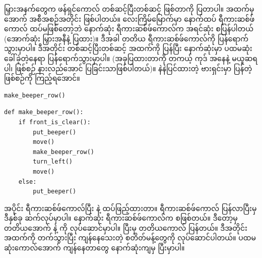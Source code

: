 မြှားအနက်တွေက ဖန်ရှင်ကောလ်  တစ်ဆင့်ပြီးတစ်ဆင့် ဖြစ်တာကို ပြတာပါ။ အထက်မှအောက် အစီ\allowbreak အစဉ်အတိုင်း ဖြစ်ပါတယ်။ လေးကြိမ်မြောက်မှာ နောက်ထပ် ရီကားဆစ်ဖ်ကောလ် ထပ်မဖြစ်တော့ဘဲ နောက်ဆုံး ရီကားဆစ်ဖ်ကောလ်က အရင်ဆုံး  စပြန်ပါတယ် (အောက်ဆုံး မြှားအနီနဲ့ ပြထား)။ ဒီအခါ တတိယ ရီကားဆစ်ဖ်ကောလ်ကို ပြန်ရောက်သွားမှာပါ။ ဒီအတိုင်း တစ်ဆင့်ပြီးတစ်ဆင့် အထက်ကို  ပြန်ပြီး နောက်ဆုံးမှာ ပထမဆုံး ခေါ်ခဲ့တဲ့နေရာ ပြန်ရောက်သွားမှာပါ။ (အခုပြထားတာကို တကယ့်  ကုဒ် အနေနဲ့ မယူဆရပါ၊ ဖြစ်စဉ် နားလည်အောင် ပြခြင်းသာဖြစ်ပါတယ်)။ နဲနဲပြင်ထားတဲ့   ဗားရှင်းမှာ  ပြန်တဲ့ ဖြစ်စဉ်ကို ကြည့်ရအောင်။ 

%
\setlength{\fboxsep}{0pt}
\begin{verbatim}
make_beeper_row()
\end{verbatim}
%
\betweenminted{\medskipamount}
%
\setlength{\fboxsep}{0pt}
\begin{verbatim}
def make_beeper_row():
    if front_is_clear():
        put_beeper()
        move()
        make_beeper_row()
        turn_left()
        move()
    else:
        put_beeper()
\end{verbatim}
%
\btwntikzannoandpar

  အပိုင်း ရီကားဆစ်ဖ်ကောလ်ပြီး   နဲ့  ထပ်ဖြည့်ထားတာ။  ရီကားဆစ်ဖ်ကောလ်  ပြန်လာပြီးမှ ဒီနှစ်ခု ဆက်လုပ်မှာပါ။  နောက်ဆုံး ရီကားဆစ်ဖ်ကောလ်က  စဖြစ်တယ်။ ဒီတော့မှ တတိယအောက်  နဲ့  ကို လုပ်ဆောင်မှာပါ။ ပြီးမှ တတိယကောလ်  ပြန်တယ်။ ဒီအတိုင်း အထက်ကို တက်သွားပြီး ကျန်နေသေးတဲ့ စတိတ်မန့်တွေကို လုပ်ဆောင်ပါတယ်။ ပထမဆုံးကောလ်အောက် ကျန်နေတာတွေ နောက်ဆုံးကျမှ ပြီးမှာပါ။

